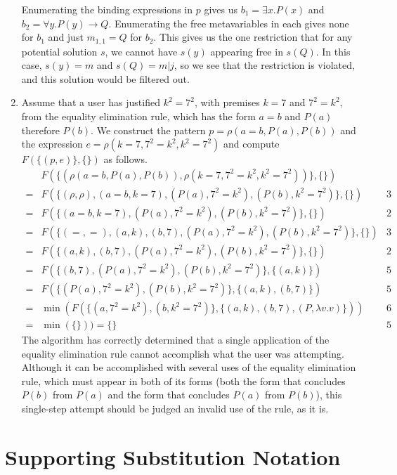 \documentclass{article}
\begin{document}
\begin{enumerate}
		Enumerating the binding expressions in $p$ gives us $b_1=\exists x.P(x)$ and $b_2=\forall y.P(y)\to Q$.  Enumerating the free metavariables in each gives none for $b_1$ and just $m_{1,1}=Q$ for $b_2$.  This gives us the one restriction that for any potential solution $s$, we cannot have $s(y)$ appearing free in $s(Q)$.  In this case, $s(y)=m$ and $s(Q)=m|j$, so we see that the restriction is violated, and this solution would be filtered out.
\item	Assume that a user has justified $k^2=7^2$, with premises $k=7$ and $7^2=k^2$, from the equality elimination rule, which has the form $a=b$ and $P(a)$ therefore $P(b)$.  We construct the pattern $p=\rho(a=b,P(a),P(b))$ and the expression $e=\rho(k=7,7^2=k^2,k^2=7^2)$ and compute $F(\{(p,e)\},\{\})$ as follows.
		\begin{align*}
			& F(\{(\rho(a=b,P(a),P(b)),\rho(k=7,7^2=k^2,k^2=7^2))\},\{\}) \\
		={}	& F(\{(\rho,\rho),(a=b,k=7),(P(a),7^2=k^2),(P(b),k^2=7^2)\},\{\}) & 3 \\
		={}	& F(\{(a=b,k=7),(P(a),7^2=k^2),(P(b),k^2=7^2)\},\{\}) & 2 \\
		={}	& F(\{(=,=),(a,k),(b,7),(P(a),7^2=k^2),(P(b),k^2=7^2)\},\{\}) & 3 \\
		={}	& F(\{(a,k),(b,7),(P(a),7^2=k^2),(P(b),k^2=7^2)\},\{\}) & 2 \\
		={}	& F(\{(b,7),(P(a),7^2=k^2),(P(b),k^2=7^2)\},\{(a,k)\}) & 5 \\
		={}	& F(\{(P(a),7^2=k^2),(P(b),k^2=7^2)\},\{(a,k),(b,7)\}) & 5 \\
		={} & \min(F(\{(a,7^2=k^2),(b,k^2=7^2)\},\{(a,k),(b,7),(P,\lambda v.v)\})) & 6 \\
		={} & \min(\{\})) = \{\} & 5
		\end{align*}
		The algorithm has correctly determined that a single application of the equality elimination rule cannot accomplish what the user was attempting.  Although it can be accomplished with several uses of the equality elimination rule, which must appear in both of its forms (both the form that concludes $P(b)$ from $P(a)$ and the form that concludes $P(a)$ from $P(b)$), this single-step attempt should be judged an invalid use of the rule, as it is.
\end{enumerate}

\section{Supporting Substitution Notation}%
\end{document}
